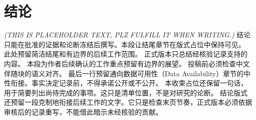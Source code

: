 \section{结论}\label{sec:conclusion}
\textit{(THIS IS PLACEHOLDER TEXT, PLZ FULFILL IT WHEN WRITING.)}
结论只能在批准的证据和论断冻结后撰写。本段让结尾章节在版式占位中保持可见。
此处预留简洁结尾和有边界的后续工作范围。
正式版本只总结经核验记录支持的内容。
本段为作者后续确认的工作重点预留有边界的展望。
投稿前必须检查中文伴随块的语义对齐。
最后一行预留通向数据可用性（Data Availability）章节的中性衔接。事实决定记录前，不得承诺公开或不公开。
本收束占位还保留一句话，用于简要列出尚待完成的事项。这只是清单位置，不是对研究的论断。
结论版式还预留一段克制地衔接后续工作的文字。它只是检查末页节奏，正式版本必须依据审核后的记录重写，不能借此暗示未经核验的贡献。
\nocite{placeholder-method,placeholder-guideline}
